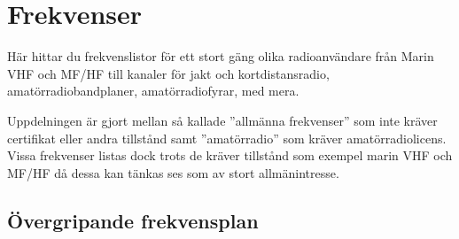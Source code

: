 
\chapter{Frekvenser}

Här hittar du frekvenslistor för ett stort gäng olika radioanvändare från
Marin VHF och MF/HF till kanaler för jakt och kortdistansradio,
amatörradiobandplaner, amatörradiofyrar, med mera.

Uppdelningen är gjort mellan så kallade ''allmänna frekvenser'' som inte
kräver certifikat eller andra tillstånd samt ''amatörradio'' som kräver
amatörradiolicens. Vissa frekvenser listas dock trots de kräver tillstånd som
exempel marin VHF och MF/HF då dessa kan tänkas ses som av stort
allmänintresse.

\clearpage

\section{Övergripande frekvensplan}

